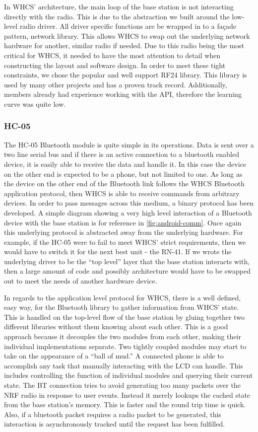 \documentclass[draft,twocolumn,letterpaper,10pt]{IEEEtran}
\begin{document}
In WHCS' architecture, the main loop of the base station is not
interacting directly with the radio. This is due to the abstraction we
built around the low-level radio driver. All driver specific functions are
be wrapped in to a fa\c{c}ade pattern, network library. This allows WHCS
to swap out the underlying network hardware for another, similar radio if
needed.  Due to this
radio being the most critical for WHCS, it needed to have the most attention to
detail when constructing the layout and software design. In order to meet these
tight constraints, we chose the popular and well support RF24 library. This
library is used by many other projects and has a proven track record.
Additionally, members already had experience working with the API, therefore
the learning curve was quite low.

\subsubsection{HC-05}
The HC-05 Bluetooth module is quite simple in its operations. Data is sent over
a two line serial bus and if there is an active connection to a bluetooth
enabled device, it is easily able to receive the data and handle it. In
this case the device on the other end is expected to be a phone, but not
limited to one. As long as the device on the other end of the Bluetooth link
follows the WHCS Bluetooth application protocol, then WHCS is able to
receive commands from arbitrary devices. In order to pass messages across this
medium, a binary protocol has been developed. A simple
diagram showing a very high level interaction of a Bluetooth device with the base
station is for reference in \autoref{fig:android-comm}. Once again
this underlying protocol is abstracted away from the underlying
hardware. For example, if the HC-05 were to fail to meet WHCS' strict
requirements, then we would have to switch it for the next best unit - the
RN-41. If we wrote the underlying driver to be the ``top level'' layer that the
base station interacts with, then a large amount of code and possibly
architecture would have to be swapped out to meet the needs of another hardware
device.

In regards to the application level protocol for WHCS, there is a
well defined, easy way, for the Bluetooth library to gather information from
WHCS' state. This is handled on the top-level flow of the base station by
gluing together two different libraries without them knowing about each other.
This is a good approach because it decouples the two modules from each
other, making their individual implementations separate. Two tightly coupled
modules may start to take on the appearance of a ``ball of mud.'' A connected
phone is able to accomplish any task that manually interacting with the
LCD can handle. This includes controlling the function of individual
modules and querying their current state. The BT connection tries to avoid
generating too many packets over the NRF radio in response to user events.
Instead it merely lookups the cached state from the base station's memory.
This is faster and the round trip time is quick. Also, if a
bluetooth packet requires a radio packet to be generated, this
interaction is asynchronously tracked until the request has been
fulfilled.
\end{document}
